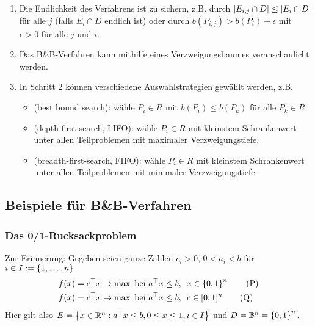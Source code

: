 \begin{*bemerkung}
	\begin{enumerate}
		\item Die Endlichkeit des Verfahrens ist zu sichern, z.B. durch $\left| E_{i,j} \cap D \right| \le \left| E_i \cap D \right|$ für alle $j$ (falls $E_i \cap D$ endlich ist) oder durch $b(P_{i,j}) > b(P_i) + \epsilon$ mit $\epsilon > 0$ für alle $j$ und $i$.
		\item Das B\&B-Verfahren kann mithilfe eines Verzweigungsbaumes veranschaulicht werden.
		\item In Schritt 2 können verschiedene Auswahlstrategien gewählt werden, z.B. 
		\begin{itemize}[noitemsep]
			\item {} (best bound search): wähle $P_i \in R$ mit $b(P_i) \le b(P_k)$ für alle $P_k \in R$.
			\item {} (depth-first search, LIFO): wähle $P_i \in R$ mit kleinstem Schrankenwert unter allen Teilproblemen mit maximaler Verzweigungstiefe.
			\item {} (breadth-first-search, FIFO): wähle $P_i \in R$ mit kleinstem Schrankenwert unter allen Teilproblemen mit minimaler Verzweigungstiefe.
		\end{itemize}
	\end{enumerate}
\end{*bemerkung}

\subsection{Beispiele für B\&B-Verfahren}

\subsubsection{Das 0/1-Rucksackproblem}

Zur Erinnerung: Gegeben seien ganze Zahlen $c_i > 0$, $0 < a_i < b$ für $i \in I \mathrel{:=} \left\{ 1, \dots, n \right\}$
\begin{align*}
	f(x) &= c^{\top} x \to \max \text{ bei } a^{\top} x \le b, \enskip x \in \left\{ 0,1 \right\}^n 
	\tag{P} \\
	f(x) &= c^{\top} x \to \max \text{ bei } a^{\top} x \le b, \enskip c \in [0,1]^n 
	\tag{Q} \label{eq: rucksack-q}
\end{align*}
Hier gilt also $E = \left\{ x \in \mathbb{R}^n : a^{\top} x \le b, 0 \le x \le 1, i \in I \right\}$ und $D = \mathbb{B}^n = \left\{ 0,1 \right\}^n$.

